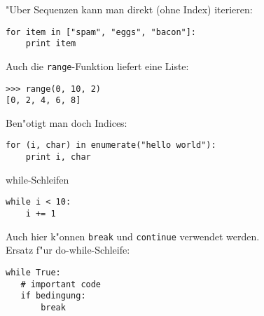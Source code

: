 \begin{frame}[fragile]
"Uber Sequenzen kann man direkt (ohne Index) iterieren:
\begin{lstlisting}[style=Python]
for item in ["spam", "eggs", "bacon"]:
    print item
\end{lstlisting}

Auch die \texttt{range}-Funktion liefert eine Liste:
\begin{lstlisting}[style=Shell]
>>> range(0, 10, 2)
[0, 2, 4, 6, 8]
\end{lstlisting}
Ben"otigt man doch Indices:
\begin{lstlisting}[style=Python]
for (i, char) in enumerate("hello world"):
    print i, char
\end{lstlisting}
\end{frame}

\begin{frame}[fragile]{while-Schleifen}
\begin{lstlisting}[style=Python]
while i < 10:
    i += 1
\end{lstlisting}
Auch hier k"onnen \lstinline{break} und \lstinline{continue} verwendet werden.\\[3mm]
Ersatz f"ur do-while-Schleife:
\begin{lstlisting}[style=Python]
while True:
   # important code
   if bedingung:
       break
\end{lstlisting} 
\end{frame}

